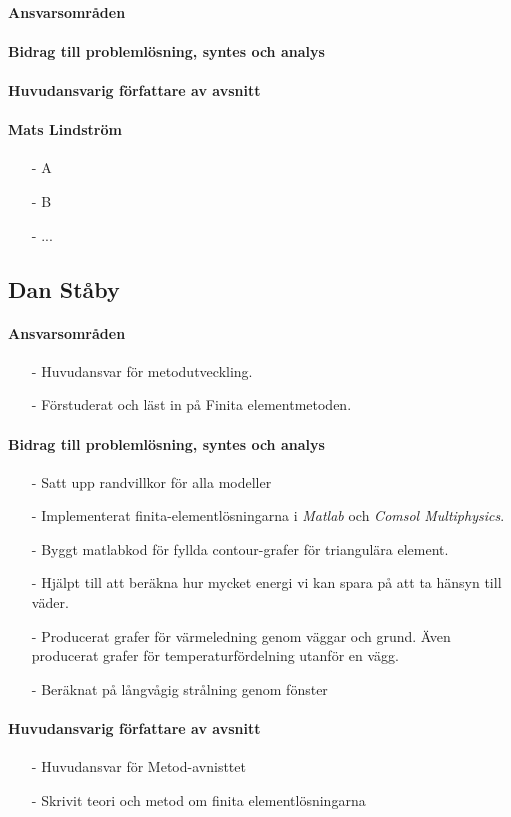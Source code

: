 \documentclass[12pt,a4paper]{article}
\begin{document}
\paragraph{Ansvarsområden}

\paragraph{Bidrag till problemlösning, syntes och analys}

\paragraph{Huvudansvarig författare av avsnitt}


\paragraph{Mats Lindström}
\begin{itemize}
\item[-] A
\item[-] B
\item[-] ...
\end{itemize}



\subsection*{Dan Ståby}

\paragraph{Ansvarsområden}
\begin{itemize}
\item[-] Huvudansvar för metodutveckling.
\item[-] Förstuderat och läst in på Finita elementmetoden.
\end{itemize}

\paragraph{Bidrag till problemlösning, syntes och analys}
\begin{itemize}
\item[-] Satt upp randvillkor för alla modeller
\item[-] Implementerat finita-elementlösningarna i \emph{Matlab} och \emph{Comsol Multiphysics}.
\item[-] Byggt matlabkod för fyllda contour-grafer för triangulära element.
\item[-] Hjälpt till att beräkna hur mycket energi vi kan spara på att ta hänsyn till väder.
\item[-] Producerat grafer för värmeledning genom väggar och grund. Även producerat grafer för temperaturfördelning utanför en vägg.
\item[-] Beräknat på långvågig strålning genom fönster
\end{itemize}

\paragraph{Huvudansvarig författare av avsnitt}
\begin{itemize}
\item[-] Huvudansvar för Metod-avnisttet
\item[-] Skrivit teori och metod om finita elementlösningarna
\end{itemize}
\end{document}
